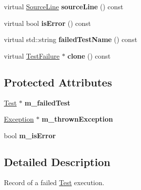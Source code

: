 \begin{DoxyCompactItemize}
\item 
\hypertarget{class_test_failure_aa3c6a076dca224d7e440212cfd127305}{virtual \hyperlink{class_source_line}{Source\+Line} {\bfseries source\+Line} () const }\label{class_test_failure_aa3c6a076dca224d7e440212cfd127305}

\item 
\hypertarget{class_test_failure_a23b25cf3452b3ab7dc84c70664f13ff0}{virtual bool {\bfseries is\+Error} () const }\label{class_test_failure_a23b25cf3452b3ab7dc84c70664f13ff0}

\item 
\hypertarget{class_test_failure_aca471a29c01d3c5e4d439aadbb1825bf}{virtual std\+::string {\bfseries failed\+Test\+Name} () const }\label{class_test_failure_aca471a29c01d3c5e4d439aadbb1825bf}

\item 
\hypertarget{class_test_failure_a0f0c86f12431ea8adde3e70e0cb52db7}{virtual \hyperlink{class_test_failure}{Test\+Failure} $\ast$ {\bfseries clone} () const }\label{class_test_failure_a0f0c86f12431ea8adde3e70e0cb52db7}

\end{DoxyCompactItemize}
\subsection*{Protected Attributes}
\begin{DoxyCompactItemize}
\item 
\hypertarget{class_test_failure_ab74a25c97a86cff454902aeeb8fe9b0e}{\hyperlink{class_test}{Test} $\ast$ {\bfseries m\+\_\+failed\+Test}}\label{class_test_failure_ab74a25c97a86cff454902aeeb8fe9b0e}

\item 
\hypertarget{class_test_failure_a4582e2503281fb614819fcb9d96f3b7a}{\hyperlink{class_exception}{Exception} $\ast$ {\bfseries m\+\_\+thrown\+Exception}}\label{class_test_failure_a4582e2503281fb614819fcb9d96f3b7a}

\item 
\hypertarget{class_test_failure_abf258e5bec289b51fb13147a62b8b75d}{bool {\bfseries m\+\_\+is\+Error}}\label{class_test_failure_abf258e5bec289b51fb13147a62b8b75d}

\end{DoxyCompactItemize}


\subsection{Detailed Description}
Record of a failed \hyperlink{class_test}{Test} execution.

